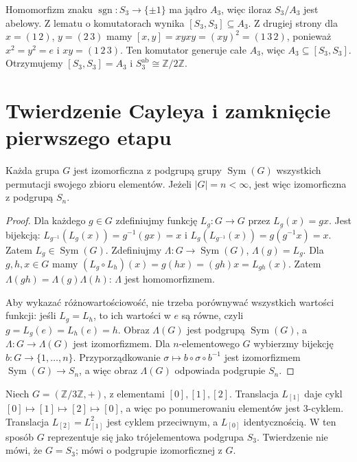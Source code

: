 \begin{przyklad}[Abelianizacja $S_3$]
\label{aa:prz:ab-s3}
Homomorfizm znaku $\operatorname{sgn}:S_3\to\{\pm1\}$
ma jądro $A_3$, więc iloraz $S_3/A_3$ jest abelowy.
Z lematu o komutatorach wynika $[S_3,S_3]\subseteq A_3$.
Z drugiej strony dla $x=(1\,2)$, $y=(2\,3)$ mamy
$[x,y]=xyxy=(xy)^2=(1\,3\,2)$,
ponieważ $x^2=y^2=e$ i $xy=(1\,2\,3)$.
Ten komutator generuje całe $A_3$, więc
$A_3\subseteq[S_3,S_3]$. Otrzymujemy
$[S_3,S_3]=A_3$ i $S_3^{\mathrm{ab}}\cong\mathbb Z/2\mathbb Z$.
\end{przyklad}

\section{Twierdzenie Cayleya i zamknięcie pierwszego etapu}
\begin{twierdzenie}[Cayleya]
\label{aa:tw:cayley}
Każda grupa $G$ jest izomorficzna z podgrupą grupy
$\operatorname{Sym}(G)$ wszystkich permutacji swojego zbioru elementów.
Jeżeli $|G|=n<\infty$, jest więc izomorficzna z podgrupą $S_n$.
\end{twierdzenie}
\begin{proof}
Dla każdego $g\in G$ zdefiniujmy funkcję
$L_g:G\to G$ przez $L_g(x)=gx$.
Jest bijekcją: $L_{g^{-1}}(L_g(x))=g^{-1}(gx)=x$
i $L_g(L_{g^{-1}}(x))=g(g^{-1}x)=x$.
Zatem $L_g\in\operatorname{Sym}(G)$.
Zdefiniujmy $\Lambda:G\to\operatorname{Sym}(G)$,
$\Lambda(g)=L_g$. Dla $g,h,x\in G$ mamy
$(L_g\circ L_h)(x)=g(hx)=(gh)x=L_{gh}(x)$.
Zatem $\Lambda(gh)=\Lambda(g)\Lambda(h)$:
$\Lambda$ jest homomorfizmem.

Aby wykazać różnowartościowość, nie trzeba porównywać
wszystkich wartości funkcji: jeśli $L_g=L_h$, to ich
wartości w $e$ są równe, czyli $g=L_g(e)=L_h(e)=h$.
Obraz $\Lambda(G)$ jest podgrupą $\operatorname{Sym}(G)$,
a $\Lambda:G\to\Lambda(G)$ jest izomorfizmem.
Dla $n$-elementowego $G$ wybierzmy bijekcję
$b:G\to\{1,\ldots,n\}$. Przyporządkowanie
$\sigma\mapsto b\circ\sigma\circ b^{-1}$
jest izomorfizmem $\operatorname{Sym}(G)\to S_n$,
a więc obraz $\Lambda(G)$ odpowiada podgrupie $S_n$.
\end{proof}

\begin{przyklad}
Niech $G=(\mathbb Z/3\mathbb Z,+)$, z elementami $[0],[1],[2]$.
Translacja $L_{[1]}$ daje cykl
$[0]\mapsto[1]\mapsto[2]\mapsto[0]$,
a więc po ponumerowaniu elementów jest $3$-cyklem.
Translacja $L_{[2]}=L_{[1]}^2$ jest cyklem przeciwnym,
a $L_{[0]}$ identycznością. W ten sposób
$G$ reprezentuje się jako trójelementowa podgrupa $S_3$.
Twierdzenie nie mówi, że $G=S_3$; mówi o podgrupie
izomorficznej z $G$.
\end{przyklad}

